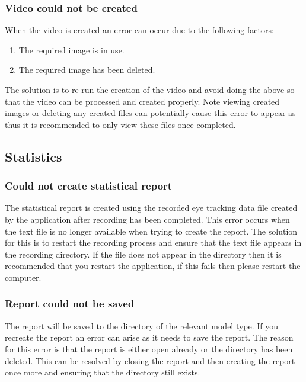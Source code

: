 \subsubsection{Video could not be created}
When the video is created an error can occur due to the following factors:
\begin{enumerate}
\item The required image is in use.
\item The required image has been deleted.
\end{enumerate}
The solution is to re-run the creation of the video and avoid doing the above so that the video can be processed and created properly. Note viewing created images or deleting any created files can potentially cause this error to appear as thus it is recommended to only view these files once completed.

\subsection{Statistics}
\subsubsection{Could not create statistical report} 
The statistical report is created using the recorded eye tracking data file created by the application after recording has been completed. This error occurs when the text file is no longer available when trying to create the report. The solution for this is to restart the recording process and ensure that the text file appears in the recording directory. If the file does not appear in the directory then it is recommended that you restart the application, if this fails then please restart the computer.

\subsubsection{Report could not be saved}
The report will be saved to the directory of the relevant model type. If you recreate the report an error can arise as it needs to save the report. The reason for this error is that the report is either open already or the directory has been deleted. This can be resolved by closing the report and then creating the report once more and ensuring that the directory still exists.